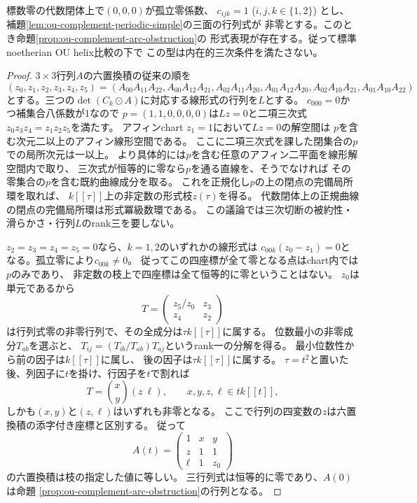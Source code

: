 \begin{theorem}[補集合周期単純対象を結ぶ形式曲線の存在]
\label{thm:ou-complement-general-arc}
標数零の代数閉体上で$(0,0,0)$が孤立零係数、
$c_{ijk}=1$ ($i,j,k\in\{1,2\}$) とし、
補題\ref{lem:ou-complement-periodic-simple}の三面の行列式が
非零とする。このとき命題\ref{prop:ou-complement-arc-obstruction}の
形式表現が存在する。従って標準noetherian OU helix比較の下で
この型は内在的三次条件を満たさない。
\end{theorem}
\begin{proof}
$3\times3$行列$A$の六置換積の従来の順を
\[
(z_0,z_1,z_2,z_3,z_4,z_5)=
(A_{00}A_{11}A_{22},A_{00}A_{12}A_{21},
 A_{02}A_{11}A_{20},A_{01}A_{12}A_{20},
 A_{02}A_{10}A_{21},A_{01}A_{10}A_{22})
\]
とする。三つの$\det(C_k\odot A)$に対応する線形式の行列を$L$とする。
$c_{000}=0$かつ補集合八係数が1なので
$p=(1,1,0,0,0,0)$は$Lz=0$と二項三次式
$z_0z_3z_4=z_1z_2z_5$を満たす。
アフィンchart $z_1=1$において$Lz=0$の解空間は
$p$を含む次元二以上のアフィン線形空間である。
ここに二項三次式を課した閉集合の$p$での局所次元は一以上。
より具体的には$p$を含む任意のアフィン二平面を線形解空間内で取り、
三次式が恒等的に零なら$p$を通る直線を、そうでなければ
その零集合の$p$を含む既約曲線成分を取る。
これを正規化し$p$の上の閉点の完備局所環を取れば、
$k[[\tau]]$上の非定数の形式枝$z(\tau)$を得る。
代数閉体上の正規曲線の閉点の完備局所環は形式冪級数環である。
この議論では三次切断の被約性・滑らかさ・行列$L$のrank三を要しない。

$z_2=z_3=z_4=z_5=0$なら、$k=1,2$のいずれかの線形式は
$c_{00k}(z_0-z_1)=0$となる。孤立零により$c_{00k}\ne0$。
従ってこの四座標が全て零となる点はchart内では$p$のみであり、
非定数の枝上で四座標は全て恒等的に零ということはない。
$z_0$は単元であるから
\[
 T=\begin{pmatrix}z_5/z_0&z_3\\ z_4&z_2\end{pmatrix}
\]
は行列式零の非零行列で、その全成分は$\tau k[[\tau]]$に属する。
位数最小の非零成分$T_{ab}$を選ぶと、
$T_{ij}=(T_{ib}/T_{ab})T_{aj}$というrank一の分解を得る。
最小位数性から前の因子は$k[[\tau]]$に属し、
後の因子は$\tau k[[\tau]]$に属する。
$\tau=t^2$と置いた後、列因子に$t$を掛け、行因子を$t$で割れば
\[
 T=\binom{x}{y}(z\ \ell),\qquad x,y,z,\ell\in t k[[t]],
\]
しかも$(x,y)$と$(z,\ell)$はいずれも非零となる。
ここで行列の四変数の$z$は六置換積の添字付き座標と区別する。
従って
\[
 A(t)=\begin{pmatrix}1&x&y\\z&1&1\\\ell&1&z_0\end{pmatrix}
\]
の六置換積は枝の指定した値に等しい。
三行列式は恒等的に零であり、$A(0)$は命題
\ref{prop:ou-complement-arc-obstruction}の行列となる。


\end{proof}
